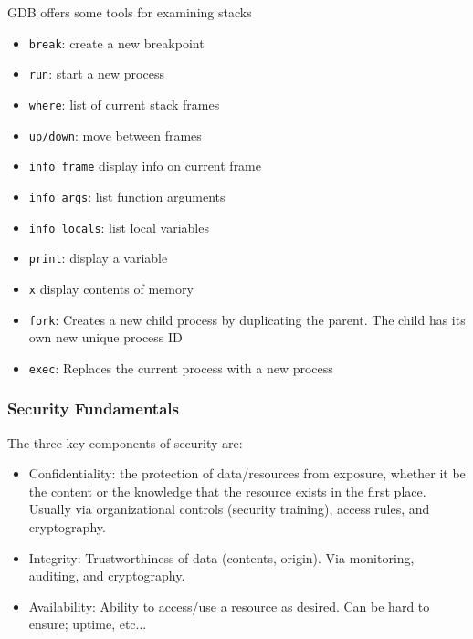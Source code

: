 \documentclass[../notes.tex]{subfiles}
\begin{document}
GDB offers some tools for examining stacks

\begin{itemize}
    \item \texttt{break}: create a new breakpoint
    \item \texttt{run}: start a new process
    \item \texttt{where}: list of current stack frames
    \item \texttt{up/down}: move between frames
    \item \texttt{info frame} display info on current frame
    \item \texttt{info args}: list function arguments
    \item \texttt{info locals}: list local variables
    \item \texttt{print}: display a variable
    \item \texttt{x} display contents of memory
\end{itemize}

\begin{itemize}
    \item \texttt{fork}: Creates a new child process by duplicating the parent. The child has its own new unique process ID
    \item \texttt{exec}: Replaces the current process with a new process
\end{itemize}




\subsubsection{Security Fundamentals}

The three key components of security are:

\begin{itemize}
    \item Confidentiality: the protection of data/resources from exposure, whether it be the content or the knowledge that the resource exists in the first place. Usually via organizational controls (security training), access rules, and cryptography.
    \item Integrity: Trustworthiness of data (contents, origin). Via monitoring, auditing, and cryptography.
    \item Availability: Ability to access/use a resource as desired. Can be hard to ensure; uptime, etc...
\end{itemize}
\end{document}
